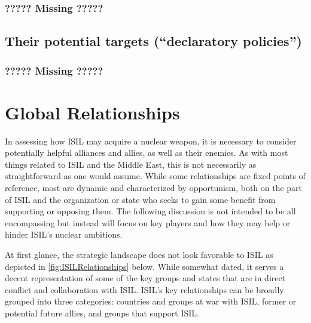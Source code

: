 \documentclass{report}
\begin{document}
\subsubsection{????? Missing ?????}


\subsection{Their potential targets (“declaratory policies”)}

\subsubsection{????? Missing ?????}

\section{Global Relationships} \label{sec:global_rels}


	



In assessing how ISIL may acquire a nuclear weapon, it is necessary to consider potentially helpful alliances and allies, as well as their enemies.  As with most things related to ISIL and the Middle East, this is not necessarily as straightforward as one would assume.  While some relationships are fixed points of reference, most are dynamic and characterized by opportunism, both on the part of ISIL and the organization or state who seeks to gain some benefit from supporting or opposing them.  The following discussion is not intended to be all encompassing but instead will focus on key players and how they may help or hinder ISIL’s nuclear ambitions.  

At first glance, the strategic landscape does not look favorable to ISIL as depicted in \autoref{fig:ISILRelationships} below.  While somewhat dated, it serves a decent representation of some of the key groups and states that are in direct conflict and collaboration with ISIL.  ISIL’s key relationships can be broadly grouped into three categories:  countries and groups at war with ISIL, former or potential future allies, and groups that support ISIL.  
\end{document}
